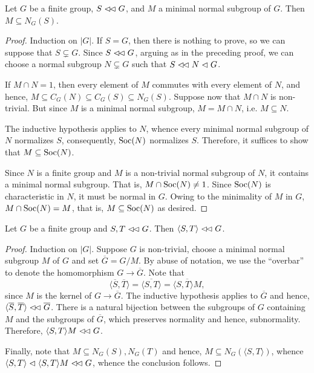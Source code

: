 \begin{theorem}
    Let $G$ be a finite group, $S\vartriangleleft\!\vartriangleleft G$, and $M$ a minimal normal subgroup of $G$. Then $M\subseteq N_G(S)$.
\end{theorem}
\begin{proof}
    Induction on $|G|$. If $S = G$, then there is nothing to prove, so we can suppose that $S\subsetneq G$. Since $S\vartriangleleft\!\vartriangleleft G$, arguing as in the preceding proof, we can choose a normal subgroup $N\subsetneq G$ such that $S\vartriangleleft\!\vartriangleleft N\vartriangleleft G$.

    If $M\cap N = 1$, then every element of $M$ commutes with every element of $N$, and hence, $M\subseteq C_G(N)\subseteq C_G(S)\subseteq N_G(S)$. Suppose now that $M\cap N$ is non-trivial. But since $M$ is a minimal normal subgroup, $M = M\cap N$, i.e. $M\subseteq N$.

    The inductive hypothesis applies to $N$, whence every minimal normal subgroup of $N$ normalizes $S$, consequently, $\operatorname{Soc}(N)$ normalizes $S$. Therefore, it suffices to show that $M\subseteq\operatorname{Soc}(N)$. 

    Since $N$ is a finite group and $M$ is a non-trivial normal subgroup of $N$, it contains a minimal normal subgroup. That is, $M\cap\operatorname{Soc}(N)\ne 1$. Since $\operatorname{Soc}(N)$ is characteristic in $N$, it must be normal in $G$. Owing to the minimality of $M$ in $G$, $M\cap\operatorname{Soc}(N) = M$, that is, $M\subseteq\operatorname{Soc}(N)$ as desired.
\end{proof}

\begin{theorem}[Wielandt]
    Let $G$ be a finite group and $S,T\vartriangleleft\!\vartriangleleft G$. Then $\langle S, T\rangle\vartriangleleft\!\vartriangleleft G$.
\end{theorem}
\begin{proof}
    Induction on $|G|$. Suppose $G$ is non-trivial, choose a minimal normal subgroup $M$ of $G$ and set $\overline G = G/M$. By abuse of notation, we use the ``overbar'' to denote the homomorphism $G\to\overline G$. Note that 
    \begin{equation*}
        \langle\overline S,\overline T\rangle = \overline{\langle S, T\rangle} = \overline{\langle S, T\rangle M},
    \end{equation*}
    since $M$ is the kernel of $G\to\overline G$. The inductive hypothesis applies to $\overline G$ and hence, $\langle\overline S,\overline T\rangle\vartriangleleft\!\vartriangleleft\overline G$. There is a natural bijection between the subgroups of $G$ containing $M$ and the subgroups of $\overline G$, which preserves normality and hence, subnormality. Therefore, $\langle S, T\rangle M\vartriangleleft\!\vartriangleleft G$.

    Finally, note that $M\subseteq N_G(S), N_G(T)$ and hence, $M\subseteq N_G(\langle S, T\rangle)$, whence $\langle S, T\rangle\vartriangleleft\langle S, T\rangle M\vartriangleleft\!\vartriangleleft G$, whence the conclusion follows.
\end{proof}

